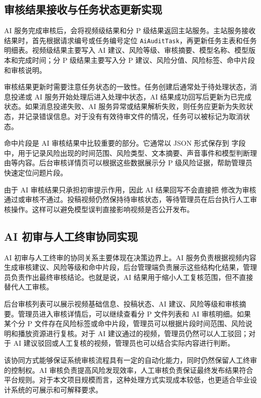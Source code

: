 \subsection{审核结果接收与任务状态更新实现}

AI 服务完成审核后，会将视频级结果和分 P 级结果返回主站服务。主站服务接收结果时，首先根据请求编号或任务编号定位 \texttt{AiAuditTask}，再更新任务主表和任务明细表。视频级结果主要写入 AI 建议、风险等级、审核摘要、模型名称、模型版本和完成时间；分 P 级结果主要写入分 P 建议、风险分值、风险标签、命中片段和审核说明。

审核结果更新时需要注意任务状态的一致性。任务创建后通常处于待处理状态，消息投递或 AI 服务开始处理后进入处理中状态，AI 结果成功回写后更新为已完成状态。如果消息投递失败、AI 服务异常或结果解析失败，则任务应更新为失败状态，并记录错误信息。对于没有有效待审文件的情况，任务可以被标记为取消状态。

命中片段是 AI 审核结果中比较重要的部分。它通常以 JSON 形式保存到 \texttt{} 字段中，用于记录风险出现的时间范围、风险类型、文本摘要、声音事件和模型判断理由等内容。后台审核详情页可以根据这些数据展示分 P 级风险证据，帮助管理员快速定位问题片段。

由于 AI 审核结果只承担初审提示作用，因此 AI 结果回写不会直接把 \texttt{} 修改为审核通过或审核不通过。投稿视频仍然保持待审核状态，等待管理员在后台执行人工审核操作。这样可以避免模型误判直接影响视频是否公开发布。

\subsection{AI 初审与人工终审协同实现}

AI 初审与人工终审的协同关系主要体现在决策边界上。AI 服务负责根据视频内容生成审核建议、风险等级和命中片段，后台管理端负责展示这些结构化结果，管理员负责作出最终审核结论。也就是说，AI 结果用于缩小人工复核范围，但不直接替代人工审核。

后台审核列表可以展示视频基础信息、投稿状态、AI 建议、风险等级和审核摘要。管理员进入审核详情后，可以继续查看分 P 文件列表和 AI 审核明细。如果某个分 P 文件存在风险标签或命中片段，管理员可以根据片段时间范围、风险说明和播放资源进行复核。对于 AI 建议通过的视频，管理员仍然可以人工驳回；对于 AI 建议驳回或人工复核的视频，管理员也可以结合实际内容进行判断。

该协同方式能够保证系统审核流程具有一定的自动化能力，同时仍然保留人工终审的控制权。AI 审核负责提高风险发现效率，人工审核负责保证最终发布结果符合平台规则。对于本文项目规模而言，这种处理方式实现成本较低，也更适合毕业设计系统的可展示和可解释要求。

